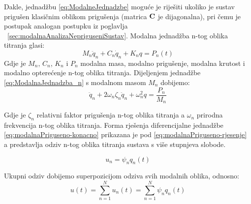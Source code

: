 Dakle, jednadžbu \eqref{eq:ModalneJednadzbe} moguće je riješiti ukoliko je sustav
prigušen klasičnim oblikom prigušenja (matrica $\mathbf{C}$ je dijagonalna), pri čemu je
postupak analogan postupku iz poglavlja ~\ref{sec:modalnaAnalizaNepriguseniSustav}. Modalna
jednadžba n-tog oblika titranja glasi:
\begin{equation}\label{eq:ModalnaJednadzba_n}
    M_n\ddot{q}_n + C_n\dot{q}_n  + K_nq = P_n(t)
\end{equation}
Gdje je $M_n$, $C_n$, $K_n$ i $P_n$ modalna masa, modalno prigušenje, modalna
krutost i modalno opterećenje n-tog oblika titranja.
Dijeljenjem jednadžbe \eqref{eq:ModalnaJednadzba_n} s modalnom masom $M_n$ dobijemo:
\begin{equation}\label{eq:modalnaPriguseno-konacno}
    \ddot{q}_n + 2\omega_n\zeta_n\ddot{q}_n + \omega_n^2q = \frac{P_n}{M_n}
\end{equation}

Gdje je $\zeta_n$ relativni faktor prigušenja n-tog oblika titranja a $\omega_n$
prirodna frekvencija n-tog oblika titranja. Forma rješenja diferencijalne jednadžbe 
\eqref{eq:modalnaPriguseno-konacno} prikazana je pod \eqref{eq:modalnaPriguseno-rjesenje} 
a predstavlja odziv n-tog oblika titranja sustava s više stupnjeva slobode. 

\begin{equation}\label{eq:modalnaPriguseno-rjesenje}
    u_n = \psi_n q_n(t)
\end{equation}

Ukupni odziv dobijemo superpozicijom odziva svih modalnih oblika, odnosno:
\begin{equation} 
    u(t) = \sum_{n=1}^Nu_n(t) = \sum_{n=1}^N\psi_nq_n(t)
\end{equation}
